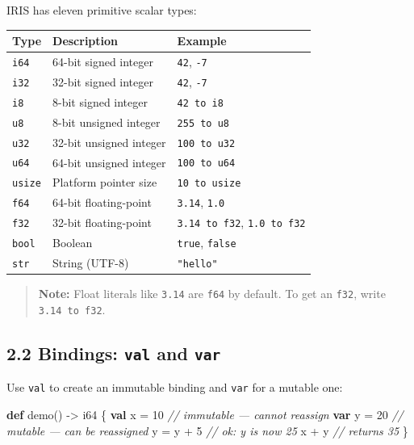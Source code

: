 \documentclass[
  english,
]{book}
\newenvironment{Shaded}{\begin{snugshade}}{\end{snugshade}}
\newcommand{\CommentTok}[1]{\textcolor[rgb]{0.42,0.60,0.33}{\textit{#1}}}
\newcommand{\DataTypeTok}[1]{\textcolor[rgb]{0.31,0.79,0.69}{#1}}
\newcommand{\DecValTok}[1]{\textcolor[rgb]{0.71,0.81,0.66}{#1}}
\newcommand{\KeywordTok}[1]{\textcolor[rgb]{0.34,0.61,0.84}{\textbf{#1}}}
\newcommand{\NormalTok}[1]{\textcolor[rgb]{0.83,0.83,0.83}{#1}}
\newcommand{\OperatorTok}[1]{\textcolor[rgb]{0.83,0.83,0.83}{#1}}
\begin{document}
IRIS has eleven primitive scalar types:

\begin{longtable}[]{@{}lll@{}}
\toprule\noalign{}
Type & Description & Example \\
\midrule\noalign{}
\endhead
\bottomrule\noalign{}
\endlastfoot
\texttt{i64} & 64-bit signed integer & \texttt{42}, \texttt{-7} \\
\texttt{i32} & 32-bit signed integer & \texttt{42}, \texttt{-7} \\
\texttt{i8} & 8-bit signed integer & \texttt{42\ to\ i8} \\
\texttt{u8} & 8-bit unsigned integer & \texttt{255\ to\ u8} \\
\texttt{u32} & 32-bit unsigned integer & \texttt{100\ to\ u32} \\
\texttt{u64} & 64-bit unsigned integer & \texttt{100\ to\ u64} \\
\texttt{usize} & Platform pointer size & \texttt{10\ to\ usize} \\
\texttt{f64} & 64-bit floating-point & \texttt{3.14}, \texttt{1.0} \\
\texttt{f32} & 32-bit floating-point & \texttt{3.14\ to\ f32},
\texttt{1.0\ to\ f32} \\
\texttt{bool} & Boolean & \texttt{true}, \texttt{false} \\
\texttt{str} & String (UTF-8) & \texttt{"hello"} \\
\end{longtable}

\begin{quote}
\textbf{Note:} Float literals like \texttt{3.14} are \texttt{f64} by
default. To get an \texttt{f32}, write \texttt{3.14\ to\ f32}.
\end{quote}

\subsection{\texorpdfstring{2.2 Bindings: \texttt{val} and
\texttt{var}}{2.2 Bindings: val and var}}\label{bindings-val-and-var}

Use \texttt{val} to create an immutable binding and \texttt{var} for a
mutable one:

\begin{Shaded}
\begin{Highlighting}[]
\KeywordTok{def}\NormalTok{ demo() }\OperatorTok{{-}\textgreater{}} \DataTypeTok{i64}\NormalTok{ \{}
    \KeywordTok{val}\NormalTok{ x }\OperatorTok{=} \DecValTok{10}         \CommentTok{// immutable — cannot reassign}
    \KeywordTok{var}\NormalTok{ y }\OperatorTok{=} \DecValTok{20}         \CommentTok{// mutable — can be reassigned}
\NormalTok{    y }\OperatorTok{=}\NormalTok{ y }\OperatorTok{+} \DecValTok{5}          \CommentTok{// ok: y is now 25}
\NormalTok{    x }\OperatorTok{+}\NormalTok{ y              }\CommentTok{// returns 35}
\NormalTok{\}}
\end{Highlighting}
\end{Shaded}
\end{document}
